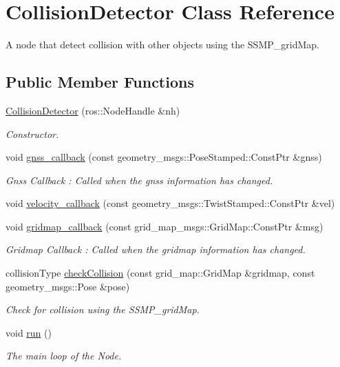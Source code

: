 \hypertarget{classCollisionDetector}{}\section{Collision\+Detector Class Reference}
\label{classCollisionDetector}


A node that detect collision with other objects using the S\+S\+M\+P\+\_\+grid\+Map.  


\subsection*{Public Member Functions}
\begin{DoxyCompactItemize}
\item 
\hyperlink{classCollisionDetector_a5c43466988b198a4e09c30255760465d}{Collision\+Detector} (ros\+::\+Node\+Handle \&nh)
\begin{DoxyCompactList}\small\item\em Constructor. \end{DoxyCompactList}\item 
void \hyperlink{classCollisionDetector_a58422375b62b0eee48dbd73d7943bad9}{gnss\+\_\+callback} (const geometry\+\_\+msgs\+::\+Pose\+Stamped\+::\+Const\+Ptr \&gnss)
\begin{DoxyCompactList}\small\item\em Gnss Callback \+: Called when the gnss information has changed. \end{DoxyCompactList}\item 
void \hyperlink{classCollisionDetector_a2ab3d4266ac3f872bb033235b10173ef}{velocity\+\_\+callback} (const geometry\+\_\+msgs\+::\+Twist\+Stamped\+::\+Const\+Ptr \&vel)
\item 
void \hyperlink{classCollisionDetector_a47d78bbe04c6b7ceb2ba143c67e8388b}{gridmap\+\_\+callback} (const grid\+\_\+map\+\_\+msgs\+::\+Grid\+Map\+::\+Const\+Ptr \&msg)
\begin{DoxyCompactList}\small\item\em Gridmap Callback \+: Called when the gridmap information has changed. \end{DoxyCompactList}\item 
collision\+Type \hyperlink{classCollisionDetector_a9dd68a8a3fc937d28cb236d720456802}{check\+Collision} (const grid\+\_\+map\+::\+Grid\+Map \&gridmap, const geometry\+\_\+msgs\+::\+Pose \&pose)
\begin{DoxyCompactList}\small\item\em Check for collision using the S\+S\+M\+P\+\_\+grid\+Map. \end{DoxyCompactList}\item 
void \hyperlink{classCollisionDetector_ade868f8b060fec62a139e1694d714f86}{run} ()
\begin{DoxyCompactList}\small\item\em The main loop of the Node. \end{DoxyCompactList}\end{DoxyCompactItemize}


